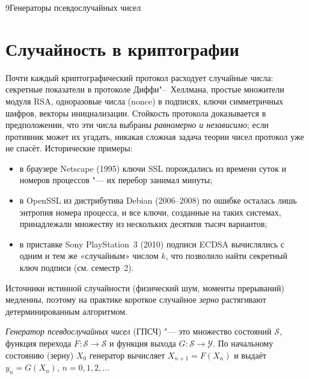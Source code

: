 \begin{lecture}{9}{Генераторы псевдослучайных чисел}

\section{Случайность в криптографии}

Почти каждый криптографический протокол расходует случайные числа: секретные показатели
в протоколе Диффи"--~Хеллмана, простые множители модуля RSA, одноразовые числа (nonce) в
подписях, ключи симметричных шифров, векторы инициализации. Стойкость протокола доказывается
в предположении, что эти числа выбраны \emph{равномерно и независимо}; если противник может
их угадать, никакая сложная задача теории чисел протокол уже не спасёт. Исторические примеры:
\begin{itemize}
  \item в браузере Netscape (1995) ключи SSL порождались из времени суток и номеров процессов "---
    их перебор занимал минуты;
  \item в OpenSSL из дистрибутива Debian (2006--2008) по ошибке осталась лишь энтропия номера
    процесса, и все ключи, созданные на таких системах, принадлежали множеству из нескольких
    десятков тысяч вариантов;
  \item в приставке Sony PlayStation~3 (2010) подписи ECDSA вычислялись с одним и тем же
    «случайным» числом $k$, что позволило найти секретный ключ подписи (см. семестр~2).
\end{itemize}

Источники истинной случайности (физический шум, моменты прерываний) медленны, поэтому на
практике короткое случайное \emph{зерно} растягивают детерминированным алгоритмом.

\begin{definition}
\emph{Генератор псевдослучайных чисел} (ГПСЧ) "--- это множество состояний $\mathcal{S}$,
функция перехода $F \colon \mathcal{S} \to \mathcal{S}$ и функция выхода
$G \colon \mathcal{S} \to \mathcal{Y}$. По начальному состоянию (зерну) $X_0$ генератор
вычисляет $X_{n+1} = F(X_n)$ и выдаёт $y_n = G(X_n)$, $n = 0, 1, 2, \dots$
\end{definition}


\end{lecture}
